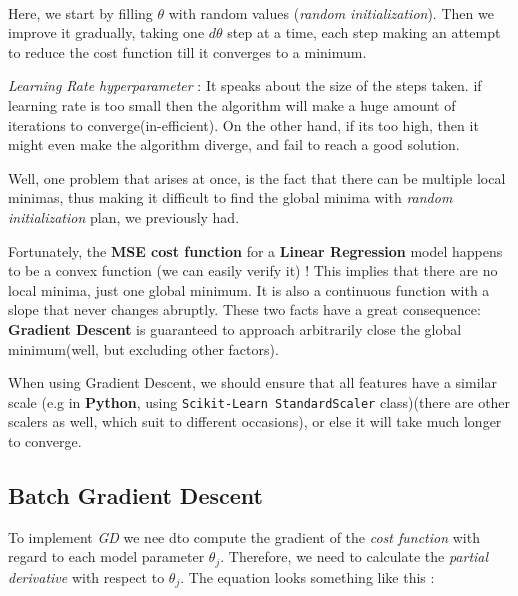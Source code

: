 \documentclass[11pt, a4paper]{book}
\begin{document}
    \begin{center}
    \end{center}
    { \hspace*{\fill} \\}

Here, we start by filling \(\theta\) with random values (\emph{random
initialization}). Then we improve it gradually, taking one \(d\theta\)
step at a time, each step making an attempt to reduce the cost function
till it converges to a minimum.

\emph{Learning Rate hyperparameter} : It speaks about the size of the
steps taken. if learning rate is too small then the algorithm will make
a huge amount of iterations to converge(in-efficient). On the other
hand, if its too high, then it might even make the algorithm diverge,
and fail to reach a good solution.

Well, one problem that arises at once, is the fact that there can be
multiple local minimas, thus making it difficult to find the global
minima with \emph{random initialization} plan, we previously had.

Fortunately, the \textbf{MSE cost function} for a \textbf{Linear
Regression} model happens to be a convex function (we can easily verify
it) ! This implies that there are no local minima, just one global
minimum. It is also a continuous function with a slope that never
changes abruptly. These two facts have a great consequence:
\textbf{Gradient Descent} is guaranteed to approach arbitrarily close
the global minimum(well, but excluding other factors).

When using Gradient Descent, we should ensure that all features have a
similar scale (e.g in \textbf{Python}, using
\texttt{Scikit-Learn\ StandardScaler} class)(there are other scalers as
well, which suit to different occasions), or else it will take much
longer to converge.

    \hypertarget{batch-gradient-descent}{%
\subsection{Batch Gradient Descent}\label{batch-gradient-descent}}

To implement \emph{GD} we nee dto compute the gradient of the \emph{cost
function} with regard to each model parameter \(\theta_{j}\). Therefore,
we need to calculate the \emph{partial derivative} with respect to
\(\theta_{j}\). The equation looks something like this :
\end{document}
